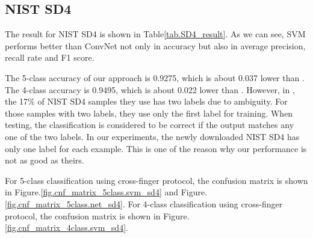 \subsection{NIST SD4}

The result for NIST SD4 is shown in Table\ref{tab.SD4_result}. 
%
As we can see, SVM performs better than ConvNet not only in accuracy but also in average precision, recall rate and F1 score. 

The 5-class accuracy of our approach is 0.9275, which is about 0.037 lower than \cite{cao2013fingerprint}. The 4-class accuracy is 0.9495, which is about 0.022 lower than \cite{cao2013fingerprint}.
%
However, in \cite{cao2013fingerprint}, the 17\% of NIST SD4 samples they use has two labels due to ambiguity. For those samples with two labels, they use only the first label for training. When testing, the classification is considered to be correct if the output matches any one of the two labels. In our experiments, the newly downloaded NIST SD4 has only one label for each example. This is one of the reason why our performance is not as good as theirs.


For 5-class classification using cross-finger protocol, the confusion matrix is shown in Figure.\ref{fig.cnf_matrix_5class.svm_sd4} and Figure.\ref{fig.cnf_matrix_5class.net_sd4}.
For 4-class classification using cross-finger protocol, the confusion matrix is shown in Figure.\ref{fig.cnf_matrix_4class.svm_sd4}.


